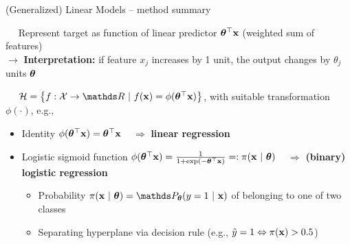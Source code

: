 \begin{vbframe}{(Generalized) Linear Models -- method summary}

   
 
\medskip

 ~~ Represent target as function of linear predictor
$\bm{\theta}^\top \mathbf{x}$ (weighted sum of features)\\
$\rightarrow$ \textbf{Interpretation:} if feature $x_j$ increases by 1 unit, the output changes by $\theta_j$ units
$\bm{\theta}$

\medskip

 ~~
$\Hspace = \left\{f: \Xspace \to \R ~|~\fx = \phi(\thetab^\top \xv)\right\}$, 
with suitable transformation $\phi(\cdot)$, e.g.,

\begin{itemize}
  \item Identity $\phi(\bm{\theta}^\top \mathbf{x}) = \bm{\theta}^\top \mathbf{x}$ 
  ~ $\Rightarrow$ \textbf{linear regression}
  \item Logistic sigmoid function $\phi(\bm{\theta}^\top \mathbf{x}) = \frac{1}{1 + \exp(- \bm{\theta}^\top \mathbf{x})} 
  =: \pi(\mathbf{x}~|~ \bm{\theta})$
  ~ $\Rightarrow$ \textbf{(binary) logistic regression}
  \begin{itemize}
    
    \item Probability $\pixt = \P_{\thetab} (y = 1 ~|~ \xv)$
    of belonging to one of two classes
    \item Separating hyperplane via decision rule 
    (e.g., $\hat{y} = 1 \Leftrightarrow \pi(\mathbf{x}) > 0.5$)
  \end{itemize}
\end{itemize}


\end{vbframe}
